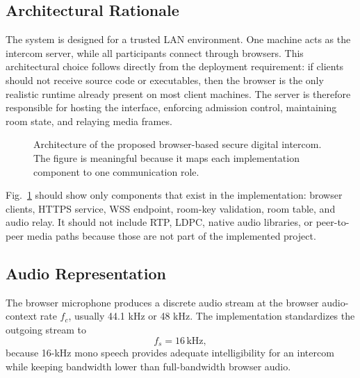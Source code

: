 \documentclass[conference]{IEEEtran}
\begin{document}
\subsection{Architectural Rationale}

The system is designed for a trusted LAN environment. One machine acts as the intercom server, while all participants connect through browsers. This architectural choice follows directly from the deployment requirement: if clients should not receive source code or executables, then the browser is the only realistic runtime already present on most client machines. The server is therefore responsible for hosting the interface, enforcing admission control, maintaining room state, and relaying media frames.

\begin{figure}[t]
    \centering
    \caption{Architecture of the proposed browser-based secure digital intercom. The figure is meaningful because it maps each implementation component to one communication role.}
    \label{fig:architecture}
\end{figure}

Fig.~\ref{fig:architecture} should show only components that exist in the implementation: browser clients, HTTPS service, WSS endpoint, room-key validation, room table, and audio relay. It should not include RTP, LDPC, native audio libraries, or peer-to-peer media paths because those are not part of the implemented project.

\subsection{Audio Representation}

The browser microphone produces a discrete audio stream at the browser audio-context rate $f_c$, usually 44.1 kHz or 48 kHz. The implementation standardizes the outgoing stream to
\begin{equation}
    f_s = 16\,\mathrm{kHz},
    \label{eq:fs}
\end{equation}
because 16-kHz mono speech provides adequate intelligibility for an intercom while keeping bandwidth lower than full-bandwidth browser audio.
\end{document}

